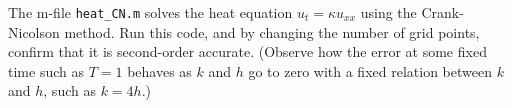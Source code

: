 The m-file \texttt{heat\_CN.m} solves the heat equation $u_t = \kappa u_{xx}$ using the Crank-Nicolson method. Run this
code, and by changing the number of grid points, confirm that it is second-order accurate. (Observe how the error at
some fixed time such as $T = 1$ behaves as $k$ and $h$ go to zero with a fixed relation between $k$ and $h$, such as
$k = 4h$.)

\begin{solution}\ \\\\
    \hfill\vfill
    \ \\
\end{solution}